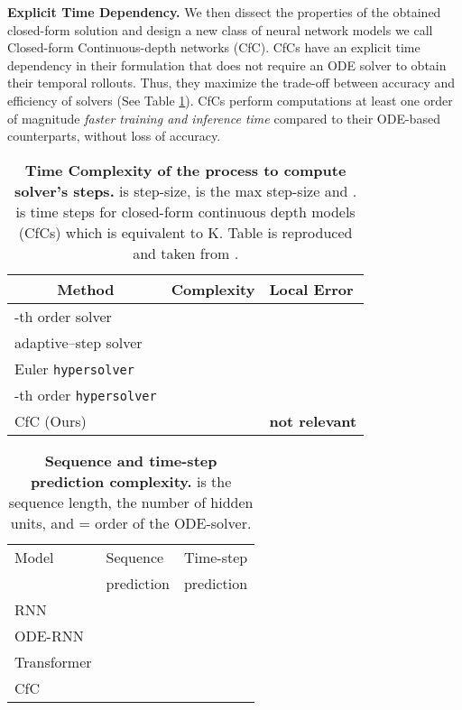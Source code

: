 \documentclass[12pt]{article}
\begin{document}
\noindent\textbf{Explicit Time Dependency.} We then dissect the properties of the obtained closed-form solution and design a new class of neural network models we call Closed-form Continuous-depth networks (CfC). CfCs have an explicit time dependency in their formulation that does not require an ODE solver to obtain their temporal rollouts. Thus, they maximize the trade-off between accuracy and efficiency of solvers (See Table \ref{tab:1}). CfCs perform computations at least one order of magnitude \textit{faster training and inference time} compared to their ODE-based counterparts, without loss of accuracy.

\begin{table}[t]
	\caption{\textbf{Time Complexity of the process to compute  solver's steps.}  is step-size,  is the max step-size and .  is time steps for closed-form continuous depth models (CfCs) which is equivalent to K. Table is reproduced and taken from \cite{poli2020hypersolvers}.}
	\setlength{\tabcolsep}{4pt}
	\centering
\begin{tabular}{lll}
		\toprule
		\multicolumn{1}{c}{Method} & \multicolumn{1}{c}{Complexity} & Local Error \\
		\midrule
		-th order solver &  &  \\
		adaptive--step solver &   & \\
		Euler {\tt hypersolver}&  &  \\
		-th order {\tt hypersolver} &  &  \\
		CfC (Ours) &  & \textbf{not relevant} \\
		\bottomrule
	\end{tabular}
	\label{tab:1}
\end{table}

\begin{table}[t]
\centering
\caption{\textbf{Sequence and time-step prediction complexity.}  is the sequence length,  the number of hidden units, and  = order of the ODE-solver.}
    \begin{tabular}{lll}\toprule
         Model & Sequence & Time-step  \\
          & prediction & prediction \\
         \midrule
         RNN &  &  \\
         ODE-RNN &  & \\
         Transformer &  & \\
         CfC &  & \\
         \bottomrule
    \end{tabular}
    \label{tab:transformers}
\end{table}
\end{document}
